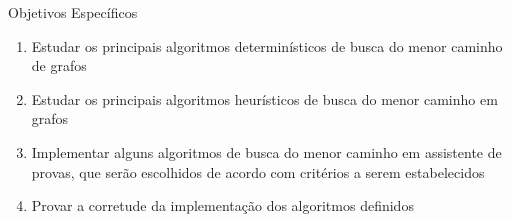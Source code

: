 \begin{frame}{Objetivos Específicos}
    \begin{enumerate}
        \item Estudar os principais algoritmos determinísticos de busca do menor caminho de grafos
        \item Estudar os principais algoritmos heurísticos de busca do menor caminho em grafos
        \item Implementar alguns algoritmos de busca do menor caminho em assistente de provas, que serão escolhidos de acordo com critérios a serem estabelecidos
        \item Provar a corretude da implementação dos algoritmos definidos
    \end{enumerate}
\end{frame}
